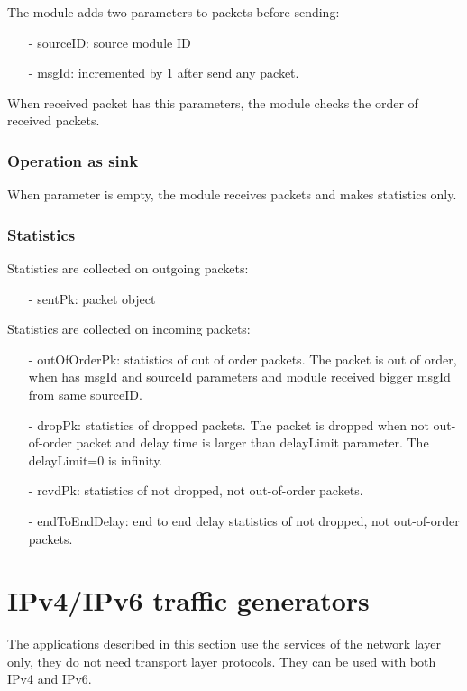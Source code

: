 The module adds two parameters to packets before sending:
\begin{itemize}
\item[-] sourceID: source module ID
\item[-] msgId: incremented by 1 after send any packet.
\end{itemize}
When received packet has this parameters, the module checks the order of received packets.

\subsubsection*{Operation as sink}

When  parameter is empty, the module receives packets and makes statistics only.

\subsubsection*{Statistics}

Statistics are collected on outgoing packets:
\begin{itemize}
\item[-] sentPk: packet object
\end{itemize}

Statistics are collected on incoming packets:
\begin{itemize}
\item[-] outOfOrderPk: statistics of out of order packets.
       The packet is out of order, when has msgId and sourceId parameters and module
       received bigger msgId from same sourceID.
\item[-] dropPk: statistics of dropped packets.
       The packet is dropped when not out-of-order packet and delay time is larger than
       delayLimit parameter. The delayLimit=0 is infinity.
\item[-] rcvdPk: statistics of not dropped, not out-of-order packets.
\item[-] endToEndDelay: end to end delay statistics of not dropped, not out-of-order packets.
\end{itemize}


\section{IPv4/IPv6 traffic generators}

The applications described in this section use the services of the network
layer only, they do not need transport layer protocols.
They can be used with both IPv4 and IPv6.

